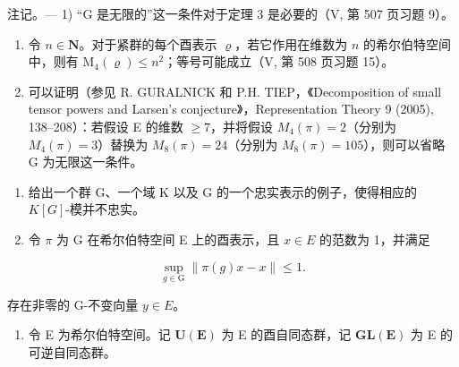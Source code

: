 注记。--- 1) “G 是无限的”这一条件对于定理 3 是必要的（V, 第 507 页习题 9）。

\begin{enumerate}
\def\labelenumi{\arabic{enumi})}
\setcounter{enumi}{1}
\item
  令 \(n \in \mathbf{N}\)。对于紧群的每个酉表示 \(\varrho\)，若它作用在维数为 \(n\) 的希尔伯特空间中，则有 \(\mathrm{M}_{4}(\varrho) \leqslant n^{2}\)；等号可能成立（V, 第 508 页习题 15）。
\item
  可以证明（参见 R. GURALNICK 和 P.H. TIEP，《Decomposition of small tensor powers and Larsen's conjecture》，Representation Theory 9 (2005), 138--208）：若假设 E 的维数 \(\geqslant 7\)，并将假设 \(M_{4}(\pi) = 2\)（分别为 \(M_{4}(\pi) = 3\)）替换为 \(M_{8}(\pi) = 24\)（分别为 \(M_{8}(\pi) = 105\)），则可以省略 G 为无限这一条件。
\end{enumerate}


\exercisesection{}

\begin{enumerate}
\def\labelenumi{\arabic{enumi})}
\item
  给出一个群 G、一个域 K 以及 G 的一个忠实表示的例子，使得相应的 \(K[G]\)-模并不忠实。
\item
  令 \(\pi\) 为 G 在希尔伯特空间 E 上的酉表示，且 \(x \in E\) 的范数为 1，并满足
\end{enumerate}

\[
\sup _ {g \in \mathrm{G}} \| \pi (g) x - x \| \leqslant 1.
\]

存在非零的 G-不变向量 \(y \in E\)。

\begin{enumerate}
\def\labelenumi{\arabic{enumi})}
\setcounter{enumi}{2}
\tightlist
\item
  令 E 为希尔伯特空间。记 \(\mathbf{U}(\mathbf{E})\) 为 E 的酉自同态群，记 \(\mathbf{GL}(\mathbf{E})\) 为 E 的可逆自同态群。
\end{enumerate}

